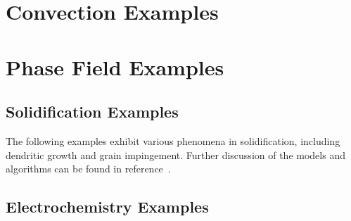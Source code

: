 \documentclass[letterpaper]{book}
\begin{document}
\chapter{Convection Examples}


% 

% 
% 

\chapter{Phase Field Examples}

\section*{Solidification Examples}

The following examples exhibit various phenomena in solidification, including
dendritic growth and grain impingement.  Further discussion of the
models and algorithms can be found in
reference~\cite{WarrenPolycrystal}.





% 

% 
% 
% 
% 
\newpage

\section*{Electrochemistry Examples}
\end{document}
